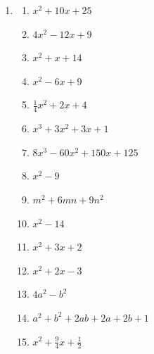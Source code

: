 \begin{description}
\begin{enumerate}[label=\textbf{\thesection.\thetempi.\thetempii}]
        \setcounter{tempii}{0}
        ~~
        
        \item \begin{multicols}{2}
            \begin{enumerate}[label=\alph*)]
                \item $x^2+10x+25$
                
                \item $4x^2-12x+9$
                
                \item $x^2+x+14$
                
                \item $x^2-6x+9$
                
                \item $\frac{1}{4}x^2+2x+4$
                
                \item $x^3+3x^2+3x+1$
                
                \item $8x^3-60x^2+150x+125$
                
                \item $x^2-9$
                
                \item $m^2+6mn+9n^2$
                
                \item $x^2-14$
                
                \item $x^2+3x+2$
                
                \item $x^2+2x-3$
                
                \item $4a^2-b^2$
                
                \item $a^2+b^2+2ab+2a+2b+1$
                
                \item $x^2+\frac{9}{4}x+\frac{1}{2}$
            \end{enumerate}
        \end{multicols}
        
        \setcounter{tempii}{0}
        ~~
        

\end{enumerate}
\end{description}

